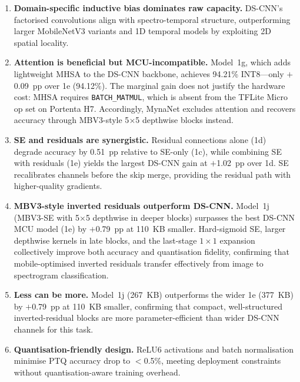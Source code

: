 \documentclass[final,5p,times,twocolumn,nolinenum]{elsarticle}
\begin{document}
\begin{enumerate}
  \item \textbf{Domain-specific inductive bias dominates raw capacity.}
        DS-CNN's factorised convolutions align with spectro-temporal
        structure, outperforming larger MobileNetV3 variants and 1D
        temporal models by exploiting 2D spatial locality.

  \item \textbf{Attention is beneficial but MCU-incompatible.}
        Model~1g, which adds lightweight MHSA to the DS-CNN backbone,
        achieves 94.21\% INT8---only $+$0.09~pp over 1e (94.12\%).  The
        marginal gain does not justify the hardware cost: MHSA requires
        \texttt{BATCH\_MATMUL}, which is absent from the TFLite Micro op
        set on Portenta H7.  Accordingly, MynaNet excludes attention and
        recovers accuracy through MBV3-style 5$\times$5 depthwise blocks
        instead.

  \item \textbf{SE and residuals are synergistic.}
        Residual connections alone (1d) degrade accuracy by 0.51~pp
        relative to SE-only (1c), while combining SE with residuals (1e)
        yields the largest DS-CNN gain at $+$1.02~pp over 1d.  SE
        recalibrates channels before the skip merge, providing the residual
        path with higher-quality gradients.

  \item \textbf{MBV3-style inverted residuals outperform DS-CNN.}
        Model~1j (MBV3-SE with 5$\times$5 depthwise in deeper blocks)
        surpasses the best DS-CNN MCU model (1e) by $+$0.79~pp at
        110~KB smaller.  Hard-sigmoid SE, larger depthwise kernels in late
        blocks, and the last-stage $1\times1$ expansion collectively
        improve both accuracy and quantisation fidelity, confirming that
        mobile-optimised inverted residuals transfer effectively from image
        to spectrogram classification.

  \item \textbf{Less can be more.}
        Model~1j (267~KB) outperforms the wider 1e (377~KB) by $+$0.79~pp
        at 110~KB smaller, confirming that compact, well-structured
        inverted-residual blocks are more parameter-efficient than wider
        DS-CNN channels for this task.

  \item \textbf{Quantisation-friendly design.}
        ReLU6 activations and batch normalisation minimise PTQ accuracy
        drop to $<$0.5\%, meeting deployment constraints without
        quantisation-aware training overhead.


\end{enumerate}
\end{document}
